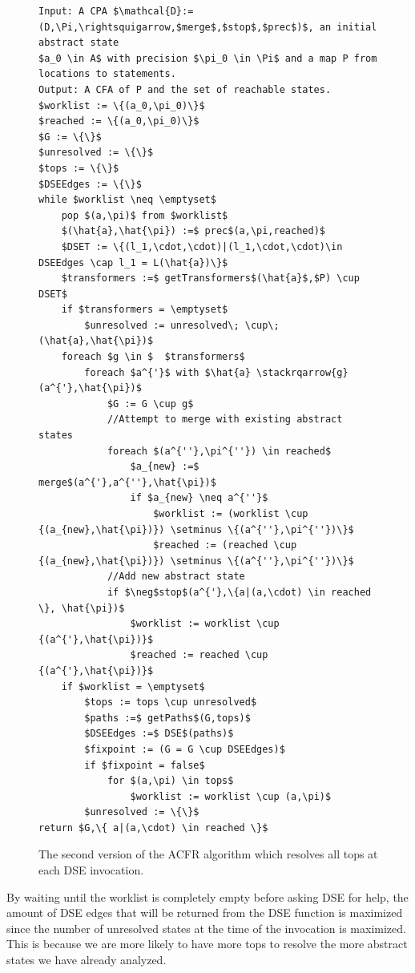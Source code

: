 \documentclass{kththesis}
\newcommand\stackrqarrow[1]{%
    \mathrel{\stackon[2pt]{$\rightsquigarrow$}{$\scriptscriptstyle#1$}}}
\begin{document}
\begin{figure}[htb]
    \centering
\begin{algorithmFrame}
\begin{lstlisting}[style=algorithm]
Input: A CPA $\mathcal{D}:=(D,\Pi,\rightsquigarrow,$merge$,$stop$,$prec$)$, an initial abstract state
$a_0 \in A$ with precision $\pi_0 \in \Pi$ and a map P from locations to statements.
Output: A CFA of P and the set of reachable states.
$worklist := \{(a_0,\pi_0)\}$
$reached := \{(a_0,\pi_0)\}$
$G := \{\}$
$unresolved := \{\}$
$tops := \{\}$
$DSEEdges := \{\}$
while $worklist \neq \emptyset$ 
    pop $(a,\pi)$ from $worklist$
    $(\hat{a},\hat{\pi}) :=$ prec$(a,\pi,reached)$
    $DSET := \{(l_1,\cdot,\cdot)|(l_1,\cdot,\cdot)\in DSEEdges \cap l_1 = L(\hat{a})\}$
    $transformers :=$ getTransformers$(\hat{a}$,$P) \cup DSET$
    if $transformers = \emptyset$
        $unresolved := unresolved\; \cup\; (\hat{a},\hat{\pi})$
    foreach $g \in $  $transformers$ 
        foreach $a^{'}$ with $\hat{a} \stackrqarrow{g} (a^{'},\hat{\pi})$
            $G := G \cup g$
            //Attempt to merge with existing abstract states
            foreach $(a^{''},\pi^{''}) \in reached$
                $a_{new} :=$ merge$(a^{'},a^{''},\hat{\pi})$
                if $a_{new} \neq a^{''}$
                    $worklist := (worklist \cup {(a_{new},\hat{\pi})}) \setminus \{(a^{''},\pi^{''})\}$
                    $reached := (reached \cup {(a_{new},\hat{\pi})}) \setminus \{(a^{''},\pi^{''})\}$
            //Add new abstract state
            if $\neg$stop$(a^{'},\{a|(a,\cdot) \in reached \}, \hat{\pi})$
                $worklist := worklist \cup {(a^{'},\hat{\pi})}$
                $reached := reached \cup {(a^{'},\hat{\pi})}$
    if $worklist = \emptyset$
        $tops := tops \cup unresolved$
        $paths :=$ getPaths$(G,tops)$
        $DSEEdges :=$ DSE$(paths)$
        $fixpoint := (G = G \cup DSEEdges)$
        if $fixpoint = false$
            for $(a,\pi) \in tops$
                $worklist := worklist \cup (a,\pi)$
        $unresolved := \{\}$
return $G,\{ a|(a,\cdot) \in reached \}$
\end{lstlisting}
\end{algorithmFrame}
\caption{The second version of the ACFR algorithm which resolves all tops at each DSE invocation.}
    \label{fig:ACFR2}
\end{figure}
\clearpage
\noindent
By waiting until the worklist is completely empty before asking DSE for help, the amount of DSE edges that will be returned from the DSE function is maximized since the number of unresolved states at the time of the invocation is maximized. This is because we are more likely to have more tops to resolve the more abstract states we have already analyzed.
\end{document}
